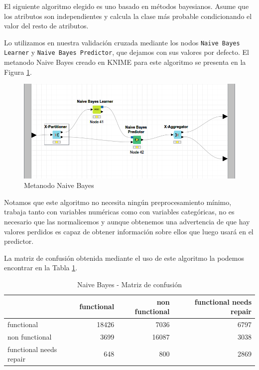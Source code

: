 \documentclass[a4paper, 20pt]{article}
\begin{document}
El siguiente algoritmo elegido es uno basado en métodos bayesianos. Asume que los atributos son independientes y calcula la clase más probable condicionando el valor del resto de atributos.

Lo utilizamos en nuestra validación cruzada mediante los nodos \texttt{Naive Bayes Learner} y \texttt{Naive Bayes Predictor}, que dejamos con sus valores por defecto. El metanodo Naive Bayes creado en KNIME para este algoritmo se presenta en la Figura \ref{fig:NaiveBayes}.

\begin{figure}[H]
    \centering
    \includegraphics[width=1\textwidth]{NaiveBayes}
    \caption{Metanodo Naive Bayes}
    \label{fig:NaiveBayes}
\end{figure}

Notamos que este algoritmo no necesita ningún preprocesamiento mínimo, trabaja tanto con variables numéricas como con variables categóricas, no es necesario que las normalicemos y aunque obtenemos una advertencia de que hay valores perdidos es capaz de obtener información sobre ellos que luego usará en el predictor.

La matriz de confusión obtenida mediante el uso de este algoritmo la podemos encontrar en la Tabla \ref{tab:CMNaiveBayes}.

\begin{table}[H]
\centering
  \caption{Naive Bayes - Matriz de confusión}
  \label{tab:CMNaiveBayes}
  \begin{tabular}{lrrr}
\toprule
    & functional & non functional & functional needs repair\\ \midrule
    functional & 18426 & 7036 & 6797\\
    non functional & 3699 & 16087 & 3038\\
    functional needs repair & 648 & 800 & 2869\\
    \bottomrule
  \end{tabular}
\end{table}
\end{document}
